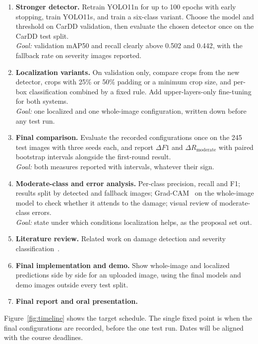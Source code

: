 \documentclass[11pt]{article}
\begin{document}
\begin{enumerate}[label=\textbf{\arabic*.}]
  \item \textbf{Stronger detector.} Retrain YOLO11n for up to 100 epochs with early stopping, train YOLO11s, and train a six-class variant. Choose the model and threshold on CarDD validation, then evaluate the chosen detector once on the CarDD test split.\\
  \emph{Goal:} validation mAP50 and recall clearly above 0.502 and 0.442, with the fallback rate on severity images reported.
  \item \textbf{Localization variants.} On validation only, compare crops from the new detector, crops with 25\% or 50\% padding or a minimum crop size, and per-box classification combined by a fixed rule. Add upper-layers-only fine-tuning for both systems.\\
  \emph{Goal:} one localized and one whole-image configuration, written down before any test run.
  \item \textbf{Final comparison.} Evaluate the recorded configurations once on the 245 test images with three seeds each, and report $\Delta F1$ and $\Delta R_{\text{moderate}}$ with paired bootstrap intervals alongside the first-round result.\\
  \emph{Goal:} both measures reported with intervals, whatever their sign.
  \item \textbf{Moderate-class and error analysis.} Per-class precision, recall and F1; results split by detected and fallback images; Grad-CAM~\cite{gradcam} on the whole-image model to check whether it attends to the damage; visual review of moderate-class errors.\\
  \emph{Goal:} state under which conditions localization helps, as the proposal set out.
  \item \textbf{Literature review.} Related work on damage detection and severity classification~\cite{perez2024,jayaseeli2021,cardd}.
  \item \textbf{Final implementation and demo.} Show whole-image and localized predictions side by side for an uploaded image, using the final models and demo images outside every test split.
  \item \textbf{Final report and oral presentation.}
\end{enumerate}

Figure~\ref{fig:timeline} shows the target schedule. The single fixed point is when the final configurations are recorded, before the one test run. Dates will be aligned with the course deadlines.
\end{document}
